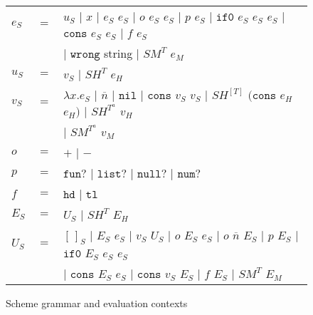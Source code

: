 \begin{figure}[p]
\centering
\begin{tabular}{lcl}
\vspace{5pt}

$e_{S}$ & $=$ & $u_{S}$ $\vert$ $x$ $\vert$ $e_{S}$ $e_{S}$ $\vert$ $o$ $e_{S}$ $e_{S}$ $\vert$ $p$ $e_{S}$ $\vert$ $\mathtt{if0}$ $e_{S}$ $e_{S}$ $e_{S}$ $\vert$ $\mathtt{cons}$ $e_{S}$ $e_{S}$ $\vert$ $f$ $e_{S}$ \\

\vspace{5pt}

&& $\vert$ $\mathtt{wrong}$ string $\vert$ $SM^{T}$ $e_{M}$ \\

\vspace{5pt}

$u_{S}$ & $=$ & $v_{S}$ $\vert$ $SH^{T}$ $e_{H}$ \\

\vspace{5pt}

$v_{S}$ & $=$ & $\lambda x.e_{S}$ $\vert$ $\overline{n}$ $\vert$ $\mathtt{nil}$ $\vert$ $\mathtt{cons}$ $v_{S}$ $v_{S}$ $\vert$ $SH^{[T]}$ $(\mathtt{cons}$ $e_{H}$ $e_{H})$ $\vert$ $SH^{T^{a}}$ $v_{H}$ \\

\vspace{5pt}

&& $\vert$ $SM^{T^{a}}$ $v_{M}$ \\

\vspace{5pt}

$o$ & $=$ & $+$ $\vert$ $-$ \\

\vspace{5pt}

$p$ & $=$ & $\mathtt{fun?}$ $\vert$ $\mathtt{list?}$ $\vert$ $\mathtt{null?}$ $\vert$ $\mathtt{num?}$ \\

\vspace{5pt}

$f$ & $=$ & $\mathtt{hd}$ $\vert$ $\mathtt{tl}$ \\

\vspace{5pt}

$E_{S}$ & $=$ & $U_{S}$ $\vert$ $SH^{T}$ $E_{H}$ \\

\vspace{5pt}

$U_{S}$ & $=$ & $[\,]_{S}$ $\vert$ $E_{S}$ $e_{S}$ $\vert$ $v_{S}$ $U_{S}$ $\vert$ $o$ $E_{S}$ $e_{S}$ $\vert$ $o$ $\overline{n}$ $E_{S}$ $\vert$ $p$ $E_{S}$ $\vert$ $\mathtt{if0}$ $E_{S}$ $e_{S}$ $e_{S}$ \\

\vspace{5pt}

&& $\vert$ $\mathtt{cons}$ $E_{S}$ $e_{S}$ $\vert$ $\mathtt{cons}$ $v_{S}$ $E_{S}$ $\vert$ $f$ $E_{S}$ $\vert$ $SM^{T}$ $E_{M}$
\end{tabular}
\caption{Scheme grammar and evaluation contexts}
\label{sg}
\end{figure}